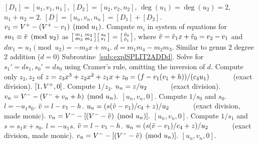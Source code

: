 \begin{algorithm}[H]
\caption{Genus 3 Split Model Degree 2 Addition\label{alg:g3explSPLIT2ADD}}
\begin{algorithmic} [1]
\Require $[D_1] = [u_1,v_1,n_1]$, $[D_2] = [u_2,v_2,n_2]$, $\deg(u_1) = \deg(u_2) = 2$, $n_1 + n_2 = 2$.
\Ensure $[D] = [u_n,v_n,n_n] = [D_1] + [D_2] $.
\algrule
\vspace{-2pt}
\State $v_1 = V^{+} - (V^{+} - v_1) \pmod{u_1}$.
\State Compute $m_i$ in system of equations for $su_1\equiv \tilde{v} \pmod{u_2}$ as $ \bigl[ \begin{smallmatrix} m_1 & m_2\\ m_3 & m_4\end{smallmatrix}\bigr] \bigl[ \begin{smallmatrix} s_0\\ s_1 \end{smallmatrix} \bigr ] = \bigl[ \begin{smallmatrix}\tilde{v}_0 \\  \tilde{v}_1\end{smallmatrix} \bigr ]$, where $\tilde{v} = \tilde{v}_1x + \tilde{v}_0 = v_2 - v_1$ and $dw_1 = u_1 \pmod{u_2} = -m_3x + m_4$.
\State $d = m_1m_4 - m_2m_3$.
    \State Similar to genus 2 degree 2 addition ($d=0$) Subroutine~\ref{sub:explSPLIT2ADDd}.
\EndIf
\State Solve for $s_1' = ds_1, s_0' = ds_0$ using Cramer's rule, omitting the inversion of $d$.
\State Compute only $z_3, z_2$ of $z = z_3x^3 + z_2x^2 + z_1x + z_0 = (f - v_1(v_1 + h))/(c_4u_1) \quad\quad\quad$ (exact division).  
         \Return $[1,V^{+},0]$.
        \Else \hspace{3pt} Compute $1/z_3$.
            \State $u_n = z/u_2 \quad\quad\quad$ (exact division).
            \State $v_n = V^{-} - (V^{-} + v_n + h) \pmod{u_n}.$
            \State \Return $[u_n,v_n,0]$.
        \EndIf
    \Else \hspace{3pt} Compute $1/s_0$ and $s_0$.
        \State $l = -u_1s_0$.
        \State $\tilde{v} = l - v_1 - h$.
        \State $u_n = (s(\tilde{v} - v_1)/c_4 + z)/u_2 \quad\quad\quad$ (exact division, made monic).
        \State $v_n = V^{-} - [(V^{-} - \tilde{v}) \pmod{u_n}].$
        \State \Return $[u_n,v_n,0]$.
    \EndIf
\EndIf
\State Compute $1/s_1$ and $s = s_1x + s_0$.
\State $l = -u_1s$.
\State $\tilde{v} = l - v_1 - h$.
\State $u_n = (s(\tilde{v} - v_1)/c_4 + z)/u_2 \quad\quad\quad$ (exact division, made monic).
\State $v_n = V^{-} - [(V^{-} - \tilde{v}) \pmod{u_n}].$ 
\State \Return $[u_n,v_n,0]$.
\vspace{-2pt}
\end{algorithmic}
\end{algorithm}


